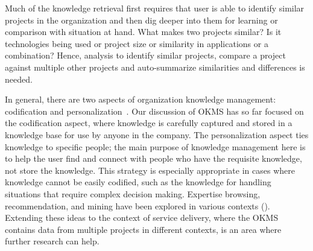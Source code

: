 Much of the knowledge retrieval first requires that user is able to identify similar projects in the organization and then dig deeper into them for learning or comparison with situation at hand. What makes two projects similar? Is it technologies being used or project size or similarity in applications or a combination? Hence, analysis to identify similar projects, compare a project against multiple other projects and auto-summarize similarities and differences is needed. 


In general, there are two aspects of organization knowledge management:
codification and personalization~\cite{hansen2000s}. Our discussion of OKMS has
so far focused on the codification aspect, where knowledge is carefully captured
and stored in a knowledge base for use by anyone in the company. The
personalization aspect ties knowledge to specific people; the main purpose of
knowledge management here is to help the user find and connect with people who
have the requisite knowledge, not store the knowledge. This strategy is
especially appropriate in cases where knowledge cannot be easily codified, such
as the knowledge for handling situations that require complex decision
making. Expertise browsing, recommendation, and mining have been explored in
various contexts (\eg \cite{Balog:2006, McDonald:2000, Mockus:2002}). Extending
these ideas to the context of service delivery, where the OKMS contains data
from multiple projects in different contexts, is an area where further research
can help.

